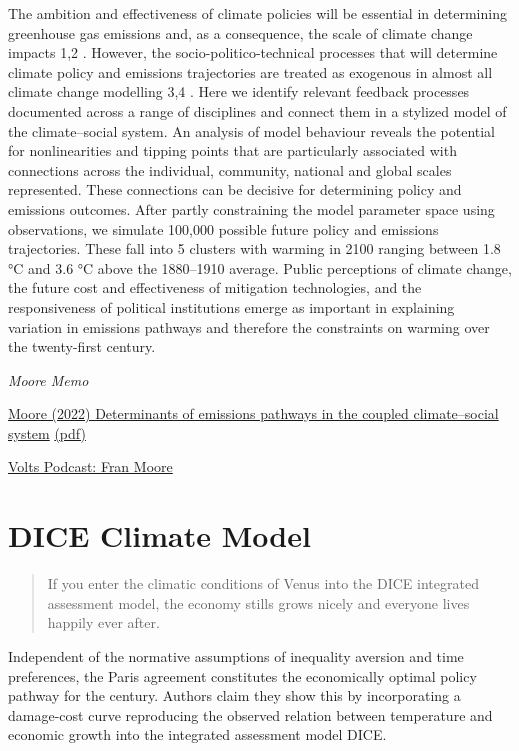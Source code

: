 \documentclass[
]{book}
\begin{document}
The ambition and effectiveness of climate policies will be essential in determining
greenhouse gas emissions and, as a consequence, the scale of climate change
impacts 1,2 . However, the socio-politico-technical processes that will determine
climate policy and emissions trajectories are treated as exogenous in almost all
climate change modelling 3,4 . Here we identify relevant feedback processes
documented across a range of disciplines and connect them in a stylized model of the
climate--social system. An analysis of model behaviour reveals the potential for
nonlinearities and tipping points that are particularly associated with connections
across the individual, community, national and global scales represented. These
connections can be decisive for determining policy and emissions outcomes. After
partly constraining the model parameter space using observations, we simulate
100,000 possible future policy and emissions trajectories. These fall into 5 clusters
with warming in 2100 ranging between 1.8 °C and 3.6 °C above the 1880--1910 average.
Public perceptions of climate change, the future cost and effectiveness of mitigation
technologies, and the responsiveness of political institutions emerge as important in
explaining variation in emissions pathways and therefore the constraints on warming
over the twenty-first century.

\emph{Moore Memo}

\href{https://www.nature.com/articles/s41586-022-04423-8}{Moore (2022) Determinants of emissions pathways in the
coupled climate--social system}
\href{pdf/Moore_2022_Coupled_Climate_Social.pdf}{(pdf)}

\href{https://www.volts.wtf/p/volts-podcast-fran-moore-on-how-to}{Volts Podcast: Fran Moore}

\hypertarget{dice-climate-model}{%
\section{DICE Climate Model}\label{dice-climate-model}}

\begin{quote}
If you enter the climatic conditions of Venus into the DICE integrated assessment model, the economy stills grows nicely and everyone lives happily ever after.
\end{quote}

Independent of the
normative assumptions of inequality aversion and time preferences,
the Paris agreement constitutes the economically optimal policy pathway
for the century.
Authors claim they show this by incorporating a
damage-cost curve reproducing
the observed relation between temperature
and economic growth into the integrated assessment model DICE.
\end{document}
